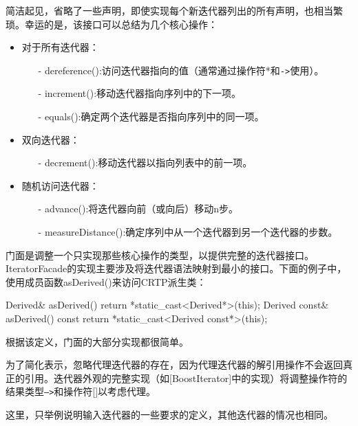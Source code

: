 简洁起见，省略了一些声明，即使实现每个新迭代器列出的所有声明，也相当繁琐。幸运的是，该接口可以总结为几个核心操作：

\begin{itemize}
\item 
对于所有迭代器：
\begin{itemize}
\item [-]
dereference():访问迭代器指向的值（通常通过操作符*和\texttt{->}使用）。

\item [-]
increment():移动迭代器指向序列中的下一项。

\item [-]
equals():确定两个迭代器是否指向序列中的同一项。
\end{itemize}

\item 
双向迭代器：
\begin{itemize}
\item [-]
decrement():移动迭代器以指向列表中的前一项。
\end{itemize}

\item 
随机访问迭代器：
\begin{itemize}
\item [-]
advance():将迭代器向前（或向后）移动n步。

\item [-]
measureDistance():确定序列中从一个迭代器到另一个迭代器的步数。
\end{itemize}
\end{itemize}

门面是调整一个只实现那些核心操作的类型，以提供完整的迭代器接口。IteratorFacade的实现主要涉及将迭代器语法映射到最小的接口。下面的例子中，使用成员函数asDerived()来访问CRTP派生类：

\begin{cpp}
Derived& asDerived() { return *static_cast<Derived*>(this); }
Derived const& asDerived() const {
	return *static_cast<Derived const*>(this);
}
\end{cpp}

根据该定义，门面的大部分实现都很简单。

\begin{notice}
为了简化表示，忽略代理迭代器的存在，因为代理迭代器的解引用操作不会返回真正的引用。迭代器外观的完整实现（如[BoostIterator]中的实现）将调整操作符的结果类型\texttt{—>}和操作符[]以考虑代理。
\end{notice}

这里，只举例说明输入迭代器的一些要求的定义，其他迭代器的情况也相同。


